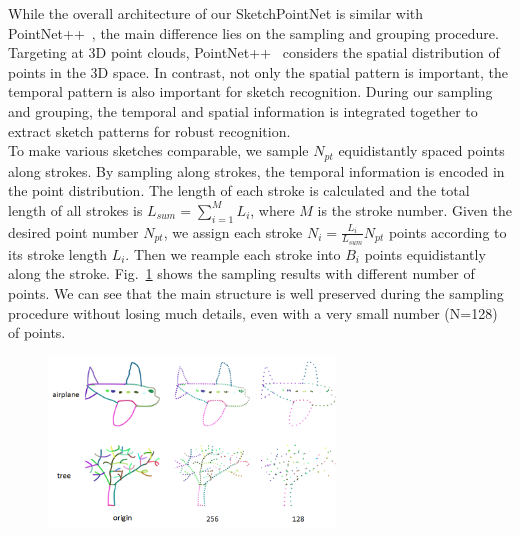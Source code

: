 While the overall architecture of our SketchPointNet is similar with PointNet++~\cite{qi2017pointnetplusplus}, the main difference lies on the sampling and grouping procedure.
Targeting at 3D point clouds, PointNet++~\cite{qi2017pointnetplusplus} considers the spatial distribution of points in the 3D space.
In contrast, not only the spatial pattern is important, the temporal pattern is also important for sketch recognition.
%
During our sampling and grouping, the temporal and spatial information is integrated together to extract sketch patterns for robust recognition.
\\
 

To make various sketches comparable, we sample $N_{pt}$ equidistantly spaced points along strokes.
By sampling along strokes, the temporal information is encoded in the point distribution. 
%
The length of each stroke is calculated and the total length of all strokes is $L_{sum}=\sum^{M}_{i=1} L_i$, where $M$ is the stroke number.
%
Given the desired point number $N_{pt}$, we assign each stroke $N_i=\frac{L_i}{L_{sum}}N_{pt}$ points according to its stroke length $L_i$.
Then we reample each stroke into $B_i$ points equidistantly along the stroke.
%
Fig.~\ref{fig:resample} shows the sampling results with different number of points.
We can see that the main structure is well preserved during the sampling procedure without losing much details, even with a very small number (N=128) of points.
\\

\begin{figure}
	\center
	\includegraphics[width=3in]{images/resample2.png}
	\label{fig:resample}
\end{figure}



